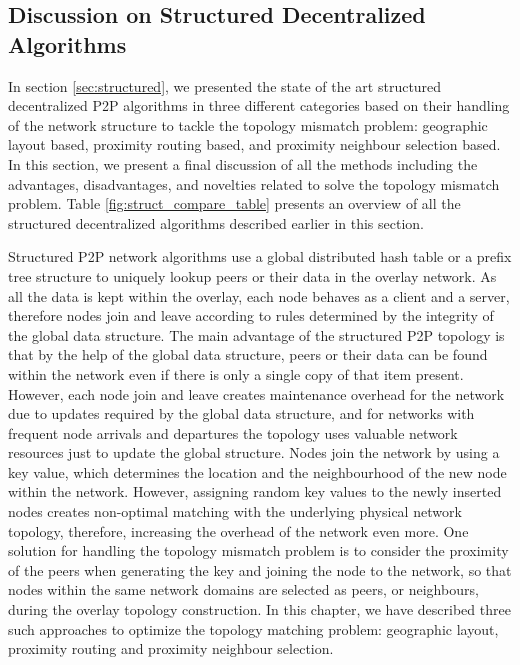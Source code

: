 \documentclass[acmcsur]{acmtrans2m}
\begin{document}
\subsection{Discussion on Structured Decentralized Algorithms}

In section \ref{sec:structured},  we presented the state of the art structured
decentralized P2P algorithms in three different categories based on their
handling of the network structure to tackle the topology mismatch problem:
geographic layout based, proximity routing based, and proximity neighbour
selection based. In this section, we present a final discussion of all the
methods including the advantages, disadvantages,
and novelties related to solve the topology mismatch problem.
Table \ref{fig:struct_compare_table} presents an overview of all the
structured decentralized algorithms described earlier in this section.

Structured P2P network algorithms use a global distributed hash table or a
prefix tree structure to uniquely lookup peers or their data in the overlay
network. As all the data is kept within the overlay, each node behaves as a
client and a server, therefore nodes join and leave according to rules
determined by the integrity of the global data structure. The main advantage of
the structured P2P topology is that by the help of the global data structure,
peers or their data can be found within the network even if there is only a
single copy of that item present. However, each node join and leave creates
maintenance overhead for the network due to updates required by the global data
structure, and for networks with frequent node arrivals and departures the
topology uses valuable network resources just to update the global structure.
Nodes join the network by using a key value, which determines the location and
the neighbourhood of the new node within the network. However, assigning
random key values to the newly inserted nodes creates non-optimal matching with
the underlying physical network topology, therefore, increasing the overhead of
the network even more. One solution for handling the topology mismatch problem
is to consider the proximity of the peers when generating the key and joining
the node to the network, so that nodes within the same network domains are
selected as peers, or neighbours, during the overlay topology construction. In
this chapter, we have described three such approaches to optimize the topology
matching problem: geographic layout, proximity routing and proximity neighbour
selection. 
\end{document}
